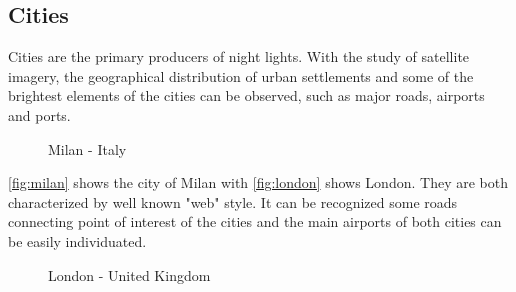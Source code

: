 \subsection{Cities}
Cities are the primary producers of night lights. With the study of satellite imagery, the geographical distribution of urban settlements and some of the brightest elements of the cities can be observed, such as major roads,  airports and ports.
\begin{figure}[h!]
    \centering
    \qquad
    \caption{Milan - Italy}%
    \label{fig:milan}
\end{figure}
\autoref{fig:milan} shows the city of Milan with \autoref{fig:london} shows London. They are both characterized by well known "web" style. It can be recognized some roads connecting point of interest of the cities and the main airports of both cities can be easily individuated.
\begin{figure}[h!]
    \centering
    \qquad
    \caption{London - United Kingdom}%
    \label{fig:london}
\end{figure}

